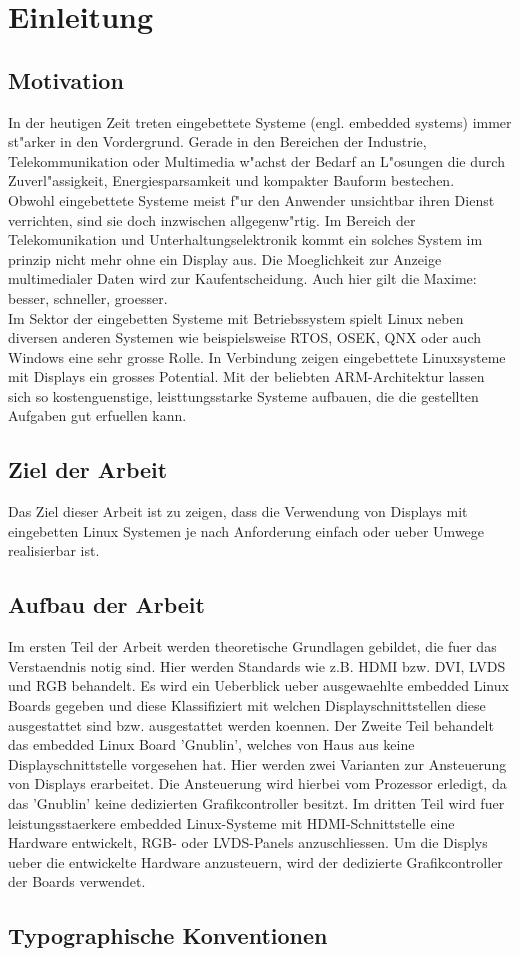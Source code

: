 \chapter{Einleitung}
\label{cha:Einleitung}

\section{Motivation}
In der heutigen Zeit treten eingebettete Systeme (engl. embedded systems) immer st"arker in den Vordergrund. Gerade in den Bereichen der Industrie, Telekommunikation oder Multimedia w"achst der Bedarf an L"osungen die durch Zuverl"assigkeit, Energiesparsamkeit und kompakter Bauform bestechen.\\
Obwohl eingebettete Systeme meist f"ur den Anwender unsichtbar ihren Dienst verrichten, sind sie doch inzwischen allgegenw"rtig. Im Bereich der Telekomunikation und Unterhaltungselektronik kommt ein solches System im prinzip nicht mehr ohne ein Display aus. Die Moeglichkeit zur Anzeige multimedialer Daten wird zur Kaufentscheidung. Auch hier gilt die Maxime: besser, schneller, groesser.\\
Im Sektor der eingebetten Systeme mit Betriebssystem spielt Linux neben diversen anderen Systemen wie beispielsweise RTOS, OSEK, QNX oder auch Windows eine sehr grosse Rolle. In Verbindung zeigen eingebettete Linuxsysteme mit Displays ein grosses Potential. Mit der beliebten ARM-Architektur lassen sich so kostenguenstige, leisttungsstarke Systeme aufbauen, die die gestellten Aufgaben gut erfuellen kann.


\section{Ziel der Arbeit}
Das Ziel dieser Arbeit ist zu zeigen, dass die Verwendung von Displays mit eingebetten Linux Systemen  je nach Anforderung einfach oder ueber Umwege realisierbar ist. 


\section{Aufbau der Arbeit}
Im ersten Teil der Arbeit werden theoretische Grundlagen gebildet, die fuer das Verstaendnis notig sind. Hier werden Standards wie z.B. HDMI bzw. DVI, LVDS und RGB behandelt. Es wird ein Ueberblick ueber ausgewaehlte embedded Linux Boards gegeben und diese Klassifiziert mit welchen Displayschnittstellen diese ausgestattet sind bzw. ausgestattet werden koennen.
Der Zweite Teil behandelt das embedded Linux Board 'Gnublin', welches von Haus aus keine Displayschnittstelle vorgesehen hat. Hier werden zwei Varianten zur Ansteuerung von Displays erarbeitet. Die Ansteuerung wird hierbei vom Prozessor erledigt, da das 'Gnublin' keine dedizierten Grafikcontroller besitzt.
Im dritten Teil wird fuer leistungsstaerkere embedded Linux-Systeme mit HDMI-Schnittstelle eine Hardware entwickelt, RGB- oder LVDS-Panels anzuschliessen. Um die Displys ueber die entwickelte Hardware anzusteuern, wird der dedizierte Grafikcontroller der Boards verwendet.

\section{Typographische Konventionen}
